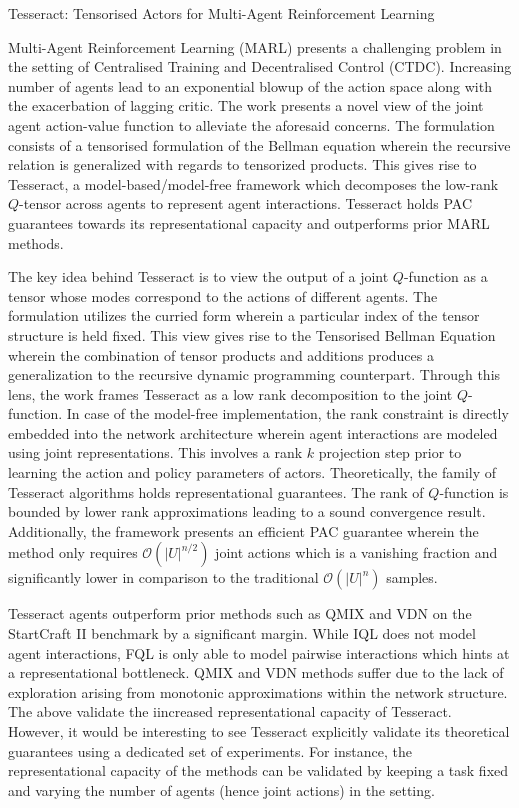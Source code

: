 \documentclass[12pt,letterpaper]{article}
\begin{document}
\begin{center}
  \large{Tesseract: Tensorised Actors for Multi-Agent Reinforcement Learning}
\end{center}

Multi-Agent Reinforcement Learning (MARL) presents a challenging problem in the setting of Centralised Training and Decentralised Control (CTDC). Increasing number of agents lead to an exponential blowup of the action space along with the exacerbation of lagging critic. The work presents a novel view of the joint agent action-value function to alleviate the aforesaid concerns. The formulation consists of a tensorised formulation of the Bellman equation wherein the recursive relation is generalized with regards to tensorized products. This gives rise to Tesseract, a model-based/model-free framework which decomposes the low-rank $Q$-tensor across agents to represent agent interactions. Tesseract holds PAC guarantees towards its representational capacity and outperforms prior MARL methods.

The key idea behind Tesseract is to view the output of a joint $Q$-function as a tensor whose modes correspond to the actions of different agents. The formulation utilizes the curried form wherein a particular index of the tensor structure is held fixed. This view gives rise to the Tensorised Bellman Equation wherein the combination of tensor products and additions produces a generalization to the recursive dynamic programming counterpart. Through this lens, the work frames Tesseract as a low rank decomposition to the joint $Q$-function. In case of the model-free implementation, the rank constraint is directly embedded into the network architecture wherein agent interactions are modeled using joint representations. This involves a rank $k$ projection step prior to learning the action and policy parameters of actors. Theoretically, the family of Tesseract algorithms holds representational guarantees. The rank of $Q$-function is bounded by lower rank approximations leading to a sound convergence result. Additionally, the framework presents an efficient PAC guarantee wherein the method only requires $\mathcal{O}(|U|^{n/2})$ joint actions which is a vanishing fraction and significantly lower in comparison to the traditional $\mathcal{O}(|U|^{n})$ samples.

Tesseract agents outperform prior methods such as QMIX and VDN on the StartCraft II benchmark by a significant margin. While IQL does not model agent interactions, FQL is only able to model pairwise interactions which hints at a representational bottleneck. QMIX and VDN methods suffer due to the lack of exploration arising from monotonic approximations within the network structure. The above validate the iincreased representational capacity of Tesseract. However, it would be interesting to see Tesseract explicitly validate its theoretical guarantees using a dedicated set of experiments. For instance, the representational capacity of the methods can be validated by keeping a task fixed and varying the number of agents (hence joint actions) in the setting.
\end{document}
